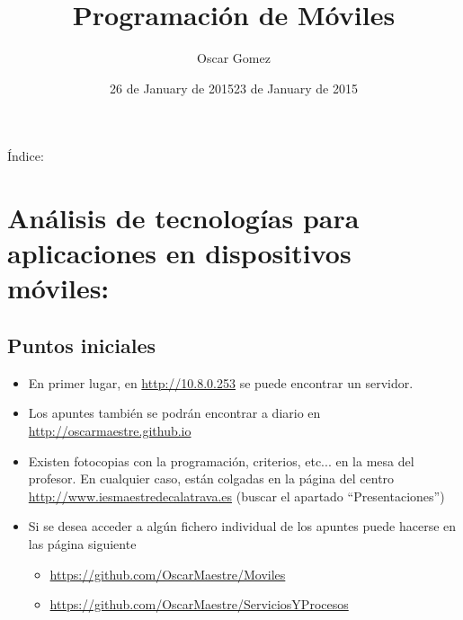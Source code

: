\documentclass[a4paper,12pt,spanish]{sphinxmanual}
\title{Programación de Móviles}
\date{26 de January de 2015}
\date{23 de January de 2015}
\author{Oscar Gomez}
\begin{document}
\maketitle
\tableofcontents
{}\label{index::doc}


Índice:


\chapter{Análisis de tecnologías para aplicaciones en dispositivos móviles:}
\label{tema1::doc}\label{tema1:analisis-de-tecnologias-para-aplicaciones-en-dispositivos-moviles}\label{tema1:prog-multimedia-y-de-dispositivos-moviles}

\section{Puntos iniciales}
\label{tema1:puntos-iniciales}\begin{itemize}
\item {} 
En primer lugar, en \href{http://10.8.0.253}{http://10.8.0.253} se puede encontrar un servidor.

\item {} 
Los apuntes también se podrán encontrar a diario en \href{http://oscarmaestre.github.io}{http://oscarmaestre.github.io}

\item {} 
Existen fotocopias con la programación, criterios, etc... en la mesa del profesor. En cualquier caso, están colgadas en la página del centro \href{http://www.iesmaestredecalatrava.es}{http://www.iesmaestredecalatrava.es} (buscar el apartado ``Presentaciones'')

\item {} 
Si se desea acceder a algún fichero individual de los apuntes puede hacerse en las página siguiente
\begin{itemize}
\item {} 
\href{https://github.com/OscarMaestre/Moviles}{https://github.com/OscarMaestre/Moviles}

\item {} 
\href{https://github.com/OscarMaestre/ServiciosYProcesos}{https://github.com/OscarMaestre/ServiciosYProcesos}

\end{itemize}

\end{itemize}
\end{document}

